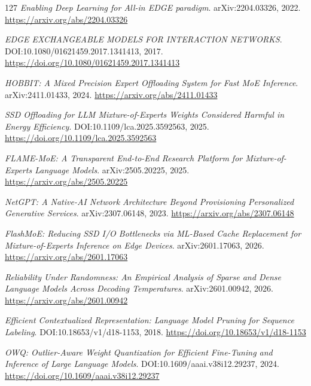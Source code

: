 \documentclass[11pt,a4paper]{article}
\begin{document}
\begin{thebibliography}{127}
\newblock \emph{Enabling Deep Learning for All-in EDGE paradigm}.
\newblock arXiv:2204.03326, 2022.
\newblock \url{https://arxiv.org/abs/2204.03326}

\newblock \emph{EDGE EXCHANGEABLE MODELS FOR INTERACTION NETWORKS}.
\newblock DOI:10.1080/01621459.2017.1341413, 2017.
\newblock \url{https://doi.org/10.1080/01621459.2017.1341413}

\newblock \emph{HOBBIT: A Mixed Precision Expert Offloading System for Fast MoE Inference}.
\newblock arXiv:2411.01433, 2024.
\newblock \url{https://arxiv.org/abs/2411.01433}

\newblock \emph{SSD Offloading for LLM Mixture-of-Experts Weights Considered Harmful in Energy Efficiency}.
\newblock DOI:10.1109/lca.2025.3592563, 2025.
\newblock \url{https://doi.org/10.1109/lca.2025.3592563}

\newblock \emph{FLAME-MoE: A Transparent End-to-End Research Platform for Mixture-of-Experts Language Models}.
\newblock arXiv:2505.20225, 2025.
\newblock \url{https://arxiv.org/abs/2505.20225}

\newblock \emph{NetGPT: A Native-AI Network Architecture Beyond Provisioning Personalized Generative Services}.
\newblock arXiv:2307.06148, 2023.
\newblock \url{https://arxiv.org/abs/2307.06148}

\newblock \emph{FlashMoE: Reducing SSD I/O Bottlenecks via ML-Based Cache Replacement for Mixture-of-Experts Inference on Edge Devices}.
\newblock arXiv:2601.17063, 2026.
\newblock \url{https://arxiv.org/abs/2601.17063}

\newblock \emph{Reliability Under Randomness: An Empirical Analysis of Sparse and Dense Language Models Across Decoding Temperatures}.
\newblock arXiv:2601.00942, 2026.
\newblock \url{https://arxiv.org/abs/2601.00942}

\newblock \emph{Efficient Contextualized Representation: Language Model Pruning for Sequence Labeling}.
\newblock DOI:10.18653/v1/d18-1153, 2018.
\newblock \url{https://doi.org/10.18653/v1/d18-1153}

\newblock \emph{OWQ: Outlier-Aware Weight Quantization for Efficient Fine-Tuning and Inference of Large Language Models}.
\newblock DOI:10.1609/aaai.v38i12.29237, 2024.
\newblock \url{https://doi.org/10.1609/aaai.v38i12.29237}


\end{thebibliography}
\end{document}
